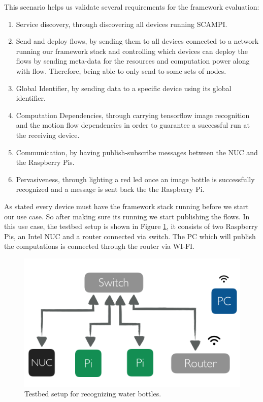 This scenario helps us validate several requirements for the framework evaluation: 
\begin{enumerate}
	
	\item Service discovery, through discovering all devices running SCAMPI.
	\item Send and deploy flows, by sending them to all devices connected to a network  running our framework stack and controlling which devices can deploy the flows by sending meta-data for the resources and computation power along with flow. Therefore, being able to only send to some sets of nodes.
	\item Global Identifier, by sending data  to a  specific device using its global identifier.

	\item Computation Dependencies, through carrying tensorflow image recognition and the motion flow dependencies in order to guarantee a successful run at the receiving device.

	\item Communication, by having publish-subscribe messages between the NUC and the Raspberry Pis.
	
	
	\item Pervasiveness, through lighting a red led once an image bottle is successfully recognized and a message is sent back the the Raspberry Pi.

\end{enumerate}

\noindent As stated every device must have the framework stack running before we start our use case. So after making sure its running we start publishing the flows. In this use case, the testbed setup is shown in Figure \ref{fig:tb-tensor}, it consists of two Raspberry Pis, an Intel NUC and a router connected via switch. The PC which will publish the computations is connected through the router via WI-FI. 
 \begin{figure}[H]
	\centering
	\includegraphics[scale=0.6]{images/tb-tensor.png}
	\caption{Testbed setup for recognizing water bottles.}
	\label{fig:tb-tensor}
\end{figure} 



